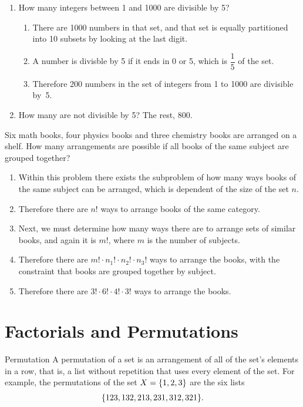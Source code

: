 \documentclass[openany, 12pt]{book}
\begin{document}
\begin{exercise}{}{}
	\begin{enumerate}[label = {(\arabic*)}]
		\item How many integers between 1 and 1000 are divisible by 5?
		      \begin{enumerate}[label={}, leftmargin=*, itemsep=0pt, parsep=0pt]
			      \item There are 1000 numbers in that set, and that set is equally partitioned
			            into 10 subsets by looking at the last digit.
			      \item A number is divisble by 5 if it ends in 0 or 5, which is $\dfrac{1}{5}$ of
			            the set.
			      \item Therefore 200 numbers in the set of integers from 1 to 1000 are divisible
			            \mbox{by 5}.
		      \end{enumerate}
		\item How many are not divisible by 5?
		      The rest, 800.
	\end{enumerate}
\end{exercise}

\begin{exercise}{}{}
	Six math books, four physics books and three chemistry books are
	arranged on a shelf. How many arrangements are possible if all books of the
	same subject are grouped together?
	\begin{enumerate}[label={\textbullet}, leftmargin=*, itemsep=0pt, parsep=0pt]
		\item Within this problem there exists the subproblem of how many ways books of
		      the same subject can be arranged, which is dependent of the size of the set
		      $n$.
		\item Therefore there are $n!$ ways to arrange books of the same category.
		\item Next, we must determine how many ways there are to arrange sets of similar
		      books, and again it is $m!$, where $m$ is the number of subjects.
		\item Therefore there are $m! \cdot n_1! \cdot n_2! \cdot n_3!$ ways to arrange the
		      books, with the constraint that books are grouped together by subject.
		\item Therefore there are $3! \cdot 6! \cdot 4! \cdot 3!$ ways to arrange the
		      books.
	\end{enumerate}
\end{exercise}

\section{Factorials and Permutations}
\begin{definition}{Permutation}{}
	A permutation of a set is an arrangement of all of the set's elements in a
	row, that is, a list without repetition that uses every element of the set.
	For example, the permutations of the set $X=\{1,2,3\}$ are the six lists
	\begin{align*}
		\{123, 132, 213, 231, 312, 321\}.
	\end{align*}
\end{definition}
\end{document}
